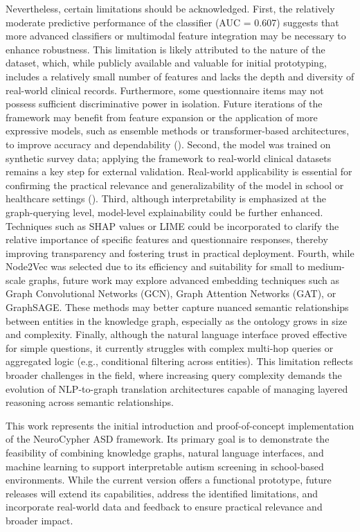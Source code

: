 \documentclass[pdflatex,sn-basic]{sn-jnl}%
\theoremstyle{thmstyleone}%
\theoremstyle{thmstyletwo}%
\theoremstyle{thmstylethree}%
\begin{document}
  Nevertheless, certain limitations should be acknowledged. First, the relatively moderate predictive performance of the
  classifier (AUC = 0.607) suggests that more advanced classifiers or multimodal feature integration may be necessary to enhance
  robustness. This limitation is likely attributed to the nature of the dataset, which, while publicly available and valuable for
  initial prototyping, includes a relatively small number of features and lacks the depth and diversity of real-world clinical
  records. Furthermore, some questionnaire items may not possess sufficient discriminative power in isolation. Future iterations
  of the framework may benefit from feature expansion or the application of more expressive models, such as ensemble methods or
  transformer-based architectures, to improve accuracy and dependability (\cite{10.14257/astl.2016.133.15}). Second, the model
  was trained on synthetic survey data; applying the framework to real-world clinical datasets remains a key step for external
  validation. Real-world applicability is essential for confirming the practical relevance and generalizability of the model in
  school or healthcare settings (\cite{10.3390/app6070200}). Third, although interpretability is emphasized at the graph-querying
  level, model-level explainability could be further enhanced. Techniques such as SHAP values or LIME could be incorporated to
  clarify the relative importance of specific features and questionnaire responses, thereby improving transparency and fostering
  trust in practical deployment. Fourth, while Node2Vec was selected due to its efficiency and suitability for small to medium-
  scale graphs, future work may explore advanced embedding techniques such as Graph Convolutional Networks (GCN), Graph Attention
  Networks (GAT), or GraphSAGE. These methods may better capture nuanced semantic relationships between entities in the knowledge
  graph, especially as the ontology grows in size and complexity. Finally, although the natural language interface proved
  effective for simple questions, it currently struggles with complex multi-hop queries or aggregated logic (e.g., conditional
  filtering across entities). This limitation reflects broader challenges in the field, where increasing query complexity demands
  the evolution of NLP-to-graph translation architectures capable of managing layered reasoning across semantic relationships.

  This work represents the initial introduction and proof-of-concept implementation of the NeuroCypher ASD framework. Its primary
  goal is to demonstrate the feasibility of combining knowledge graphs, natural language interfaces, and machine learning to
  support interpretable autism screening in school-based environments. While the current version offers a functional prototype,
  future releases will extend its capabilities, address the identified limitations, and incorporate real-world data and feedback
  to ensure practical relevance and broader impact.
\end{document}
